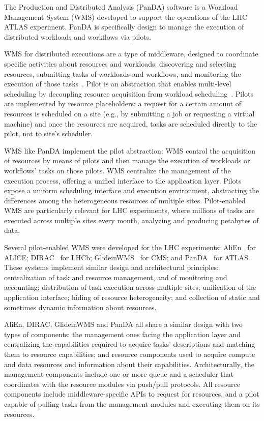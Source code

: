 The Production and Distributed Analysis (PanDA) software is a Workload
Management System (WMS) developed to support the operations of the LHC ATLAS
experiment. PanDA is specifically design to manage the execution of distributed
workloads and workflows via pilots.

WMS for distributed executions are a type of middleware, designed to coordinate
specific activities about resources and workloads: discovering and selecting
resources, submitting tasks of workloads and workflows, and monitoring the
execution of those tasks~\cite{marco2009glite}. Pilot is an abstraction that
enables multi-level scheduling by decoupling resource acquisition from workload
scheduling~\cite{turilli2015comprehensive}. Pilots are implemented by resource
placeholders: a request for a certain amount of resources is scheduled on a site
(e.g., by submitting a job or requesting a virtual machine) and once the
resources are acquired, tasks are scheduled directly to the pilot, not to site's
scheduler.

WMS like PanDA implement the pilot abstraction: WMS control the acquisition of
resources by means of pilots and then manage the execution of workloads or
workflows' tasks on those pilots. WMS centralize the management of the execution
process, offering a unified interface to the application layer. Pilots expose a
uniform scheduling interface and execution environment, abstracting the
differences among the heterogeneous resources of multiple sites. Pilot-enabled
WMS are particularly relevant for LHC experiments, where millions of tasks are
executed across multiple sites every month, analyzing and producing petabytes of
data.

Several pilot-enabled WMS were developed for the LHC experiments:
AliEn~\cite{Bagnasco2010} for ALICE; DIRAC~\cite{Paterson2010} for LHCb;
GlideinWMS~\cite{sfiligoi2008glideinwms} for CMS; and
PanDA~\cite{maeno2014evolution} for ATLAS. These systems implement similar
design and architectural principles: centralization of task and resource
management, and of monitoring and accounting; distribution of task execution
across multiple sites; unification of the application interface; hiding of
resource heterogeneity; and collection of static and sometimes dynamic
information about resources.

AliEn, DIRAC, GlideinWMS and PanDA all share a similar design with two types of
components: the management ones facing the application layer and centralizing
the capabilities required to acquire tasks' descriptions and matching them to
resource capabilities; and resource components used to acquire compute and data
resources and information about their capabilities. Architecturally, the
management components include one or more queue and a scheduler that coordinates
with the resource modules via push/pull protocols. All resource components
include middleware-specific APIs to request for resources, and a pilot capable
of pulling tasks from the management modules and executing them on its
resources.

